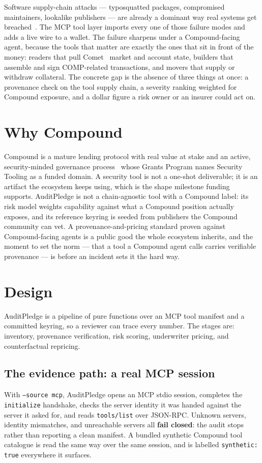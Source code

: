 \documentclass[11pt]{article}
\begin{document}
Software supply-chain attacks --- typosquatted packages, compromised maintainers, lookalike
publishers --- are already a dominant way real systems get breached~\cite{osv}. The MCP tool
layer imports every one of those failure modes and adds a live wire to a wallet. The failure
sharpens under a Compound-facing agent, because the tools that matter are exactly the ones
that sit in front of the money: readers that pull Comet~\cite{comet} market and account state,
builders that assemble and sign COMP-related transactions, and movers that supply or withdraw
collateral. The concrete gap is the absence of three things at once: a provenance check on the
tool supply chain, a severity ranking weighted for Compound exposure, and a dollar figure a
risk owner or an insurer could act on.

\section{Why Compound}
Compound is a mature lending protocol with real value at stake and an active, security-minded
governance process~\cite{compgov} whose Grants Program names Security Tooling as a funded
domain. A security tool is not a one-shot deliverable; it is an artifact the ecosystem keeps
using, which is the shape milestone funding supports. AuditPledge is not a chain-agnostic tool
with a Compound label: its risk model weights capability against what a Compound position
actually exposes, and its reference keyring is seeded from publishers the Compound community can
vet. A provenance-and-pricing standard proven against Compound-facing agents is a public good
the whole ecosystem inherits, and the moment to set the norm --- that a tool a Compound agent
calls carries verifiable provenance --- is before an incident sets it the hard way.

\section{Design}
AuditPledge is a pipeline of pure functions over an MCP tool manifest and a committed keyring,
so a reviewer can trace every number. The stages are: inventory, provenance verification, risk
scoring, underwriter pricing, and counterfactual repricing.

\subsection{The evidence path: a real MCP session}
With \texttt{--source mcp}, AuditPledge opens an MCP stdio session, completes the
\texttt{initialize} handshake, checks the server identity it was handed against the server it
asked for, and reads \texttt{tools/list} over JSON-RPC. Unknown servers, identity mismatches,
and unreachable servers all \textbf{fail closed}: the audit stops rather than reporting a clean
manifest. A bundled synthetic Compound tool catalogue is read the same way over the same
session, and is labelled \texttt{synthetic: true} everywhere it surfaces.
\end{document}
